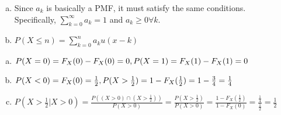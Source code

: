 \documentclass[12pt]{article}
\newenvironment{problem}[2][Problem]{\begin{trivlist}
\item[\hskip \labelsep {\bfseries #1}\hskip \labelsep {\bfseries #2.}]
  \vspace{1 cm}
}{\end{trivlist}}
\begin{document}
\begin{problem}{3.7}
\item
  \begin{enumerate}[a.]
    \item %
      Since $a_k$ is basically a PMF, it must satisfy the same conditions. \\
      Specifically, $\sum_{k=0}^\infty a_k = 1$ and $a_k \geq 0 \forall k$.
    \item %
      $P(X \leq n) = \sum_{k=0}^n a_k u(x-k)$
  \end{enumerate}
\end{problem}

\begin{problem}{3.9}
\item
  \begin{enumerate}[a.]
    \item %
      $P(X = 0) = F_X(0)-F_X(0) = 0, \\ P(X=1) = F_X(1)-F_X(1) = 0$
    \item %
      $P(X < 0) = F_X(0) = \frac{1}{2}, \\
      P(X>\frac{1}{2}) = 1 - F_X(\frac{1}{2}) = 1-\frac{3}{4} = \frac{1}{4}$
    \item %
      $P(X>\frac{1}{2} | X > 0) = \frac{P((X > 0)\cap(X >\frac{1}{2}))}{P(X>0)}
      = \frac{P(X>\frac{1}{2})}{P(X>0)} = \frac{1-F_X(\frac{1}{2})}{1-F_X(0)} 
      = \frac{\frac{1}{4}}{\frac{1}{2}} = \frac{1}{2}$ 
  \end{enumerate}
\end{problem}
\end{document}
